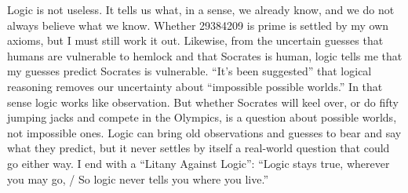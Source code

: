 Logic is not useless. It tells us what, in a sense, we already know, and we do not always believe what we know. Whether 29384209 is prime is settled by my own axioms, but I must still work it out. Likewise, from the uncertain guesses that humans are vulnerable to hemlock and that Socrates is human, logic tells me that my guesses predict Socrates is vulnerable.  ``It's been suggested'' that logical reasoning removes our uncertainty about ``impossible possible worlds.''  In that sense logic works like observation. But whether Socrates will keel over, or do fifty jumping jacks and compete in the Olympics, is a question about possible worlds, not impossible ones. Logic can bring old observations and guesses to bear and say what they predict, but it never settles by itself a real-world question that could go either way. I end with a ``Litany Against Logic'': ``Logic stays true, wherever you may go, / So logic never tells you where you live.''
